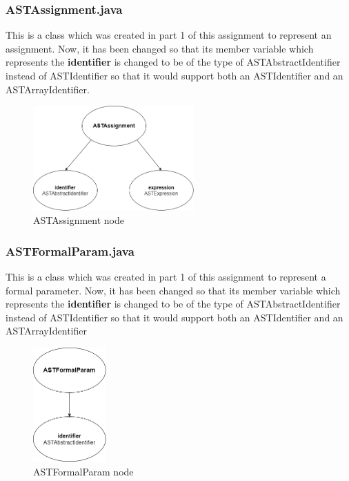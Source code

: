 \documentclass{article}
\begin{document}
					
					\subsubsection{ASTAssignment.java}
					
					This is a class which was created in part 1 of this assignment to represent an assignment. Now, it has been changed so that its member variable which represents the \textbf{identifier} is changed to be of the type of ASTAbstractIdentifier instead of ASTIdentifier so that it would support both an ASTIdentifier and an ASTArrayIdentifier.
					
					\begin{figure}[H]
					\centering
			 			\includegraphics[width=0.55\textwidth]{astassignment2.png}
			  			\caption{ASTAssignment node}
			  			\label{fig:astassignment}
					\end{figure}
					
						\subsubsection{ASTFormalParam.java}
					
					This is a class which was created in part 1 of this assignment to represent a formal parameter. Now, it has been changed so that its member variable which represents the \textbf{identifier} is changed to be of the type of ASTAbstractIdentifier instead of ASTIdentifier so that it would support both an ASTIdentifier and an ASTArrayIdentifier
					
					\begin{figure}[H]
					\centering
			 			\includegraphics[width=0.25\textwidth]{astformalparam2.png}
			  			\caption{ASTFormalParam node}
			  			\label{fig:astformalparam}
					\end{figure}
					
\end{document}
